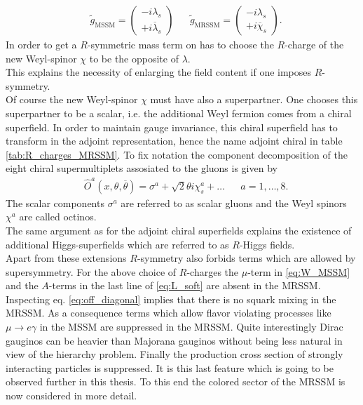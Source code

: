 \begin{align}
& \tilde{g}_\mathrm{MSSM} = \begin{pmatrix}
-i \lambda_s \\
+i \overline{\lambda}_s
\end{pmatrix} && \tilde{g}_\mathrm{MRSSM} = \begin{pmatrix}
-i \lambda_s \\
+i \overline{\chi}_s
\end{pmatrix}.
\end{align}
In order to get a $R$-symmetric mass term on has to choose the $R$-charge of the new Weyl-spinor $\chi$ to be the opposite of $\lambda$.\\
This explains the necessity of enlarging the field content if one imposes $R$-symmetry.\\
Of course the new Weyl-spinor $\chi$ must have also a superpartner. One chooses this superpartner to be a scalar, i.e. the additional Weyl fermion comes from a chiral superfield. In order to maintain gauge invariance, this chiral superfield has to transform in the adjoint representation, hence the name adjoint chiral in table \ref{tab:R_charges_MRSSM}. To fix notation the component decomposition of the eight chiral supermultiplets assosiated to the gluons is given by
\begin{align}
&\hat{O}^a(x, \theta, \overline{\theta}) = \sigma^a + \sqrt{2}\theta i\chi^a_s + \hdots && a = 1,\hdots,8.
\end{align}
The scalar components $\sigma^a$ are referred to as scalar gluons and the Weyl spinors $\chi^a$ are called octinos.\\
The same argument as for the adjoint chiral superfields explains the existence of additional Higgs-superfields which are referred to as $R$-Higgs fields.\\
Apart from these extensions $R$-symmetry also forbids terms which are allowed by supersymmetry. For the above choice of $R$-charges the $\mu$-term in \eqref{eq:W_MSSM} and the $A$-terms in the last line of \eqref{eq:L_soft} are absent in the MRSSM. Inspecting eq. \eqref{eq:off_diagonal} implies that there is no squark mixing in the MRSSM. As a consequence terms which allow flavor violating processes like $\mu \to e \gamma$ in the MSSM are suppressed in the MRSSM\cite{Kribs:2007ac}. Quite interestingly Dirac gauginos can be heavier than Majorana gauginos without being less natural in view of the hierarchy problem\cite{Nelson:2002ca, Kribs:2012gx, Hardy:2013ywa}. Finally the production cross section of strongly interacting particles is suppressed\cite{Kribs:2012gx, Kribs:2013oda}. It is this last feature which is going to be observed further in this thesis. To this end the colored sector of the MRSSM is now considered in more detail.


